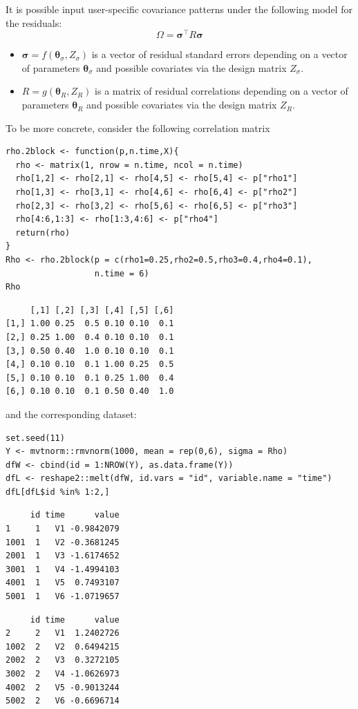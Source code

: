\documentclass[12pt]{article}
\newcommand\trans[1]{{#1}^\intercal}%
\begin{document}
It is possible input user-specific covariance patterns under the
following model for the residuals: \[\Omega =
\trans{\boldsymbol{\sigma}} R \boldsymbol{\sigma}\]
\begin{itemize}
\item \(\boldsymbol{\sigma}=f(\boldsymbol{\theta}_{\sigma},Z_{\sigma})\)
is a vector of residual standard errors depending on a vector of
parameters \(\boldsymbol{\theta}_{\sigma}\) and possible covariates
via the design matrix \(Z_{\sigma}\).
\item \(R=g(\boldsymbol{\theta}_{R},Z_R)\) is a matrix of residual
correlations depending on a vector of parameters
\(\boldsymbol{\theta}_{R}\) and possible covariates via the design
matrix \(Z_R\).
\end{itemize}

\bigskip

To be more concrete, consider the following correlation matrix
\lstset{language=r,label= ,caption= ,captionpos=b,numbers=none}
\begin{lstlisting}
rho.2block <- function(p,n.time,X){
  rho <- matrix(1, nrow = n.time, ncol = n.time)
  rho[1,2] <- rho[2,1] <- rho[4,5] <- rho[5,4] <- p["rho1"]
  rho[1,3] <- rho[3,1] <- rho[4,6] <- rho[6,4] <- p["rho2"]
  rho[2,3] <- rho[3,2] <- rho[5,6] <- rho[6,5] <- p["rho3"]
  rho[4:6,1:3] <- rho[1:3,4:6] <- p["rho4"]
  return(rho)
}
Rho <- rho.2block(p = c(rho1=0.25,rho2=0.5,rho3=0.4,rho4=0.1),
                  n.time = 6)
Rho
\end{lstlisting}

\begin{verbatim}
     [,1] [,2] [,3] [,4] [,5] [,6]
[1,] 1.00 0.25  0.5 0.10 0.10  0.1
[2,] 0.25 1.00  0.4 0.10 0.10  0.1
[3,] 0.50 0.40  1.0 0.10 0.10  0.1
[4,] 0.10 0.10  0.1 1.00 0.25  0.5
[5,] 0.10 0.10  0.1 0.25 1.00  0.4
[6,] 0.10 0.10  0.1 0.50 0.40  1.0
\end{verbatim}


and the corresponding dataset:
\lstset{language=r,label= ,caption= ,captionpos=b,numbers=none}
\begin{lstlisting}
set.seed(11)
Y <- mvtnorm::rmvnorm(1000, mean = rep(0,6), sigma = Rho)
dfW <- cbind(id = 1:NROW(Y), as.data.frame(Y))
dfL <- reshape2::melt(dfW, id.vars = "id", variable.name = "time")
dfL[dfL$id %in% 1:2,]
\end{lstlisting}

\begin{minipage}{0.45\linewidth}
\begin{verbatim}
     id time      value
1     1   V1 -0.9842079
1001  1   V2 -0.3681245
2001  1   V3 -1.6174652
3001  1   V4 -1.4994103
4001  1   V5  0.7493107
5001  1   V6 -1.0719657
\end{verbatim}


\end{minipage}
\begin{minipage}{0.45\linewidth}
\begin{verbatim}
     id time      value
2     2   V1  1.2402726
1002  2   V2  0.6494215
2002  2   V3  0.3272105
3002  2   V4 -1.0626973
4002  2   V5 -0.9013244
5002  2   V6 -0.6696714
\end{verbatim}


\end{minipage}
\end{document}
